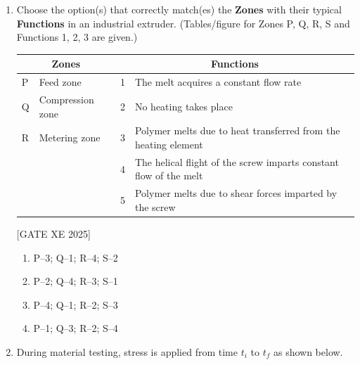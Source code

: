 \documentclass[journal,12pt,onecolumn]{IEEEtran}
\theoremstyle{remark}
\begin{document}
\begin{enumerate}
\hfill[GATE XE 2025]

\begin{multicols}{2}
\begin{enumerate}
\item Same
\item Higher
\item Lower
\item Exactly $\sqrt{2}$ times
\end{enumerate}
\end{multicols}

\item Choose the option(s) that correctly match(es) the \textbf{Zones} with their typical \textbf{Functions} in an industrial extruder. (Tables/figure for Zones P, Q, R, S and Functions 1, 2, 3 are given.)\\
\begin{tabular}{|l|l|l|l|}
\hline
\multicolumn{2}{|c|}{\textbf{Zones}} & \multicolumn{2}{|c|}{\textbf{Functions}} \\
\hline
P & Feed zone & 1 & The melt acquires a constant flow rate \\
\hline
Q & Compression zone & 2 & No heating takes place \\
\hline
R & Metering zone & 3 & Polymer melts due to heat transferred from the heating element \\
\hline
& & 4 & The helical flight of the screw imparts constant flow of the melt \\
\hline
& & 5 & Polymer melts due to shear forces imparted by the screw \\
\hline
\end{tabular}

\hfill[GATE XE 2025]

\begin{multicols}{2}
\begin{enumerate}
\item P–3; Q–1; R–4; S–2
\item P–2; Q–4; R–3; S–1
\item P–4; Q–1; R–2; S–3
\item P–1; Q–3; R–2; S–4
\end{enumerate}
\end{multicols}



\item During material testing, stress is applied from time $t_i$ to $t_f$ as shown below.\\


\end{enumerate}
\end{document}
